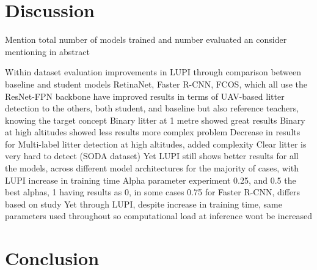 
\section{Discussion}
\label{sec:5_discussion}
Mention total number of models trained and number evaluated an consider mentioning in abstract

Within dataset evaluation
improvements in LUPI through comparison between baseline and student models
RetinaNet, Faster R-CNN, FCOS, which all use the ResNet-FPN backbone have improved results in terms of UAV-based litter detection to the others, both student, and baseline but also reference teachers, knowing the target concept
Binary litter at 1 metre showed great results
Binary at high altitudes showed less results more complex problem
Decrease in results for Multi-label litter detection at high altitudes, added complexity
Clear litter is very hard to detect (SODA dataset)
Yet LUPI still shows better results for all the models, across different model architectures for the majority of cases, with LUPI increase in training time
Alpha parameter experiment 0.25, and 0.5 the best alphas, 1 having results as 0, in some cases 0.75 for Faster R-CNN, differs based on study
Yet through LUPI, despite increase in training time, same parameters used throughout so computational load at inference wont be increased

\section{Conclusion}
\label{sec:5_conclusion}



